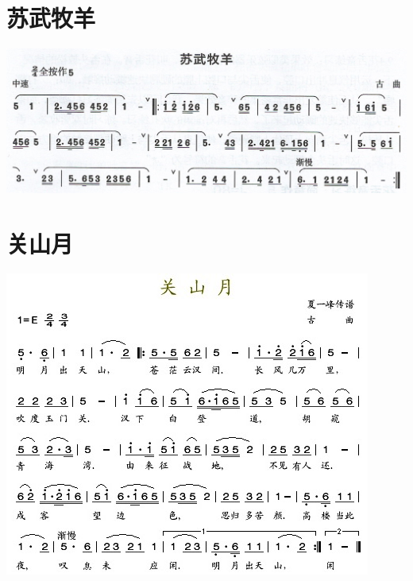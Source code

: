\documentclass[cn,pad,twocol]{elegantbook}
\begin{document}
\section{苏武牧羊}
    \includegraphics[width=\textwidth]{dongxiao/20200711-苏武牧羊.jpeg}
\section{关山月}
    \includegraphics[width=\textwidth]{dongxiao/20200411-清平乐-关山月.jpg}
\end{document}
